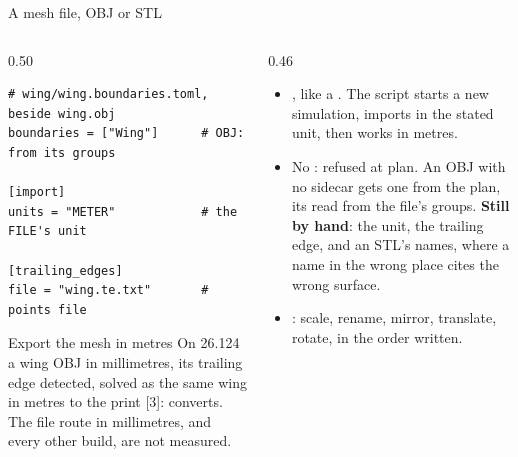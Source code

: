\begin{frame}[fragile]{A mesh file, OBJ or STL}
\begin{columns}[T]
\begin{column}{0.50\textwidth}
\begin{lstlisting}[style=ftsbase]
# wing/wing.boundaries.toml, beside wing.obj
boundaries = ["Wing"]      # OBJ: from its groups

[import]
units = "METER"            # the FILE's unit

[trailing_edges]
file = "wing.te.txt"       # points file
\end{lstlisting}
\begin{alertblock}{Export the mesh in metres}
\small On 26.124 a wing OBJ in millimetres, its trailing edge detected,
solved as the same wing in metres to the print [3]: 
converts. The file route in millimetres, and every other build, are not
measured.
\end{alertblock}
\end{column}
\begin{column}{0.46\textwidth}
\begin{itemize}\small
  \item {}, like a . The script starts a
        new simulation, imports in the stated unit, then works in metres.
  \item No \code{[import]}: refused at plan. An OBJ with no sidecar gets
        one from the plan, its  read from the file's groups.
        \textbf{Still by hand}: the \code{[import]} unit, the
        trailing edge, and an STL's names, where a name in the wrong place
        cites the wrong surface.
  \item {}: scale, rename, mirror, translate,
        rotate, in the order written.
\end{itemize}
\end{column}
\end{columns}
\end{frame}

